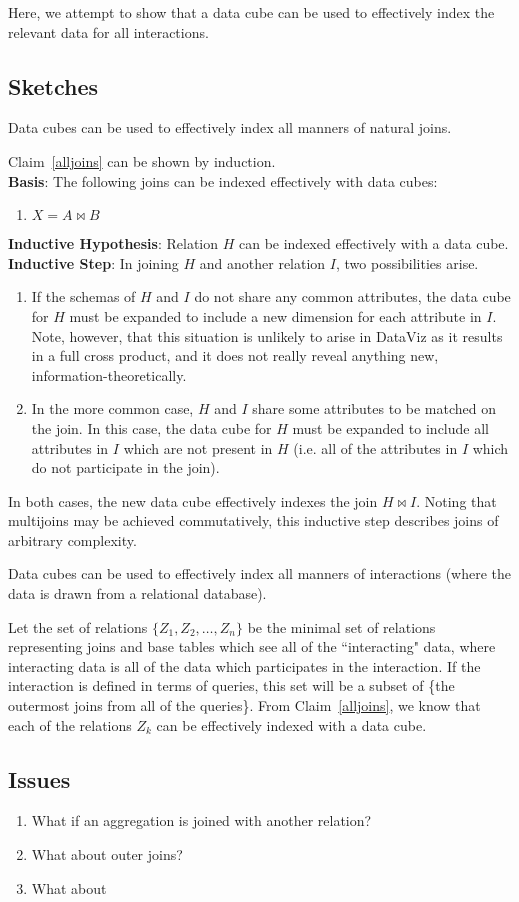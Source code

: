 Here, we attempt to show that a data cube can be used to effectively index the relevant data for all interactions.
\subsection{Sketches}
\begin{claim}\label{alljoins}
Data cubes can be used to effectively index all manners of natural joins.
\end{claim}

\begin{sketch}
Claim~\ref{alljoins} can be shown by induction.\\
\textbf{Basis}: The following joins can be indexed effectively with data cubes:
\begin{enumerate}
	\item $X = A\bowtie{}B$
\end{enumerate}
\textbf{Inductive Hypothesis}: Relation $H$ can be indexed effectively with a data cube.\\
\textbf{Inductive Step}: In joining $H$ and another relation $I$, two possibilities arise.
\begin{enumerate}
	\item If the schemas of $H$ and $I$ do not share any common attributes, the data cube for $H$ must be expanded to include a new dimension for each attribute in $I$.
	Note, however, that this situation is unlikely to arise in DataViz as it results in a full cross product, and it does not really reveal anything new, information-theoretically.
	\item In the more common case, $H$ and $I$ share some attributes to be matched on the join.
	In this case, the data cube for $H$ must be expanded to include all attributes in $I$ which are not present in $H$ (i.e. all of the attributes in $I$ which do not participate in the join).
\end{enumerate}
In both cases, the new data cube effectively indexes the join \mbox{$H\bowtie{}I$}.
Noting that multijoins may be achieved commutatively, this inductive step describes joins of arbitrary complexity.
\end{sketch}

\begin{claim}
Data cubes can be used to effectively index all manners of interactions (where the data is drawn from a relational database).
\end{claim}

\begin{sketch}
Let the set of relations $\{Z_1, Z_2, \ldots, Z_n\}$ be the minimal set of relations representing joins and base tables which see all of the ``interacting" data, where interacting data is all of the data which participates in the interaction.
If the interaction is defined in terms of queries, this set will be a subset of \{the outermost joins from all of the queries\}.
From Claim~\ref{alljoins}, we know that each of the relations $Z_k$ can be effectively indexed with a data cube.
\end{sketch}
\subsection{Issues}
\begin{enumerate}
	\item What if an aggregation is joined with another relation?
	\item What about outer joins?
	\item What about 
\end{enumerate}